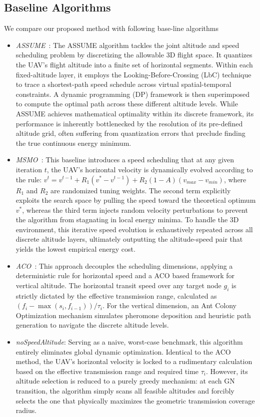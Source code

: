 \subsection{Baseline Algorithms}
We compare our proposed method with following base-line algorithms
\begin{itemize}
    \item \textit{ASSUME~\cite{assume}}: The ASSUME algorithm tackles the joint altitude and speed scheduling problem by discretizing the allowable 3D flight space.
    It quantizes the UAV's flight altitude into a finite set of horizontal segments.
    Within each fixed-altitude layer, it employs the Looking-Before-Crossing (LbC) technique to trace a shortest-path speed schedule across virtual spatial-temporal constraints.
    A dynamic programming (DP) framework is then superimposed to compute the optimal path across these different altitude levels.
    While ASSUME achieves mathematical optimality within its discrete framework, its performance is inherently bottlenecked by the resolution of its pre-defined altitude grid, often suffering from quantization errors that preclude finding the true continuous energy minimum.
    \item \textit{MSMO~\cite{msmo}}: This baseline introduces a speed scheduling that at any given iteration $t$, the UAV's horizontal velocity is dynamically evolved according to the rule: $v^{t}=v^{t-1}+R_{1}(v^{*}-v^{t-1})+R_{2}(1-A)(v_{max}-v_{min})$, where $R_{1}$ and $R_{2}$ are randomized tuning weights.
    The second term explicitly exploits the search space by pulling the speed toward the theoretical optimum $v^{*}$, whereas the third term injects random velocity perturbations to prevent the algorithm from stagnating in local energy minima.
    To handle the 3D environment, this iterative speed evolution is exhaustively repeated across all discrete altitude layers, ultimately outputting the altitude-speed pair that yields the lowest empirical energy cost.
    \item \textit{ACO~\cite{bi-aco}}: This approach decouples the scheduling dimensions, applying a deterministic rule for horizontal speed and a ACO based framework for vertical altitude.
    The horizontal transit speed over any target node $g_{i}$ is strictly dictated by the effective transmission range, calculated as $(f_{i}-\max(s_{i}, f_{i-1})) / \tau_{i}$.
    For the vertical dimension, an Ant Colony Optimization mechanism simulates pheromone deposition and heuristic path generation to navigate the discrete altitude levels.
    \item \textit{noSpeedAltitude}: Serving as a naive, worst-case benchmark, this algorithm entirely eliminates global dynamic optimization.
    Identical to the ACO method, the UAV's horizontal velocity is locked to a rudimentary calculation based on the effective transmission range and required time $\tau_{i}$.
    However, its altitude selection is reduced to a purely greedy mechanism: at each GN transition, the algorithm simply scans all feasible altitudes and forcibly selects the one that physically maximizes the geometric transmission coverage radius.
\end{itemize}
